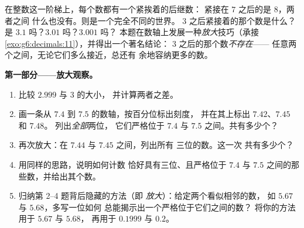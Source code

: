 \begin{problem}
\label{pb:g6:decimals:1}
在整数这一阶梯上，每个数都有一个紧挨着的后继数：
紧接在 $7$ 之后的是 $8$，两者之间
什么也没有。则是一个完全不同的世界。
$3$ 之后紧接着的那个数是什么？是 $3.1$ 吗？$3.01$ 吗？$3.001$ 吗？
本题在数轴上发展一种\emph{放大}技巧（承接
\cref{exo:g6:decimals:11}），并得出一个著名结论：
$3$ 之后的那个数\emph{不存在}——
任意两个之间，无论它们多么接近，总还有
余地容纳更多的数。

\medskip
\noindent\textbf{第一部分——放大观察。}
\begin{enumerate}
  \item 比较 $2.999$ 与 $3$ 的大小，
        并计算两者之差。
  \item 画一条从 $7.4$ 到 $7.5$ 的数轴，按百分位标出刻度，
        并在其上标出 $7.42$、$7.45$ 和 $7.48$。
        列出\emph{全部}两位，
        它们严格位于 $7.4$ 与 $7.5$ 之间。共有多少个？
  \item 再次放大：在 $7.44$ 与 $7.45$ 之间，列出所有
        三位的数。这一次
        共有多少个？
  \item 用同样的思路，说明如何计数
        恰好具有三位、且严格位于
        $7.4$ 与 $7.5$ 之间的那些数，并给出其个数。
  \item 归纳第 2--4 题背后隐藏的方法（即
        \emph{放大}）：给定两个看似相邻的数，
        如 $5.67$ 与 $5.68$，多写一位如何
        总能揭示出一个严格位于它们之间的数？
        将你的方法用于 $5.67$ 与 $5.68$，
        再用于 $0.1999$ 与 $0.2$。
\end{enumerate}


\end{problem}
